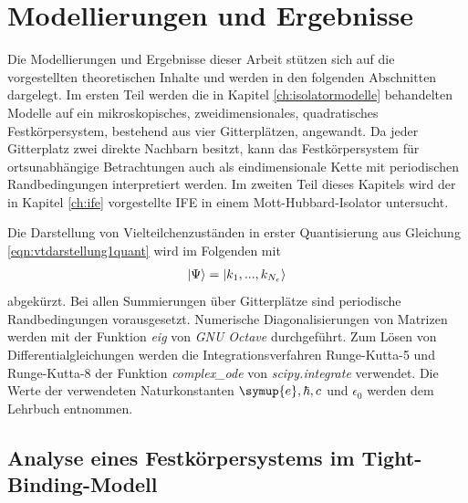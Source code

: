 \chapter{Modellierungen und Ergebnisse}
\label{ch:ergebnisse}

Die Modellierungen und Ergebnisse dieser Arbeit stützen sich auf die vorgestellten theoretischen Inhalte und werden in den folgenden Abschnitten dargelegt.
Im ersten Teil werden die in Kapitel \ref{ch:isolatormodelle} behandelten Modelle auf ein mikroskopisches, zweidimensionales, quadratisches Festkörpersystem, bestehend aus vier Gitterplätzen, angewandt.
Da jeder Gitterplatz zwei direkte Nachbarn besitzt, kann das Festkörpersystem für ortsunabhängige Betrachtungen auch als eindimensionale Kette mit periodischen Randbedingungen interpretiert werden.
Im zweiten Teil dieses Kapitels wird der in Kapitel \ref{ch:ife} vorgestellte IFE in einem Mott-Hubbard-Isolator untersucht.

Die Darstellung von Vielteilchenzuständen in erster Quantisierung aus Gleichung \eqref{eqn:vtdarstellung1quant} wird im Folgenden mit
\begin{align}
  \ket{\Psi} = \ket{k_1,...,k_{N_e}}
  \label{eqn:vtdarstellung1quantkurz}
\end{align}
abgekürzt. Bei allen Summierungen über Gitterplätze sind periodische Randbedingungen vorausgesetzt.
Numerische Diagonalisierungen von Matrizen werden mit der Funktion \textit{eig} von \textit{GNU Octave} durchgeführt.
Zum Lösen von Differentialgleichungen werden die Integrationsverfahren Runge-Kutta-5 und Runge-Kutta-8 der Funktion \textit{complex\_ode} von \textit{scipy.integrate} verwendet.
Die Werte der verwendeten Naturkonstanten $\symup{e}, \hbar, c$ und $\epsilon_0$ werden dem Lehrbuch \cite{kittel} entnommen.

\section{Analyse eines Festkörpersystems im Tight-Binding-Modell}
\label{sec:untersuchungtb}

